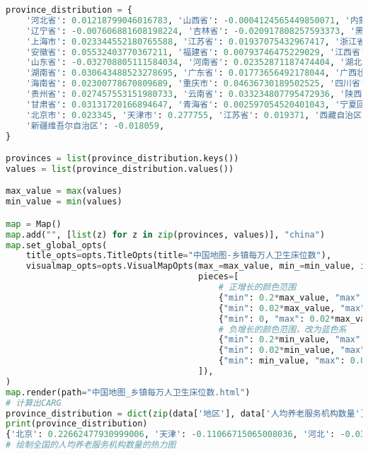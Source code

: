 \begin{lstlisting}[language=python,caption={基础设施}]
province_distribution = {
    '河北省': 0.01218799046016783, '山西省': -0.0004124565449850071, '内蒙古自治区': 0.008205003274858623, 
    '辽宁省': -0.007606881608198224, '吉林省': -0.020917808257593373, '黑龙江省': 0.007278157355442572, 
    '上海市': 0.023344552180765588, '江苏省': 0.01937075432967417, '浙江省': 0.050720686277746514, 
    '安徽省': 0.05532403770367211, '福建省': 0.00793746475229029, '江西省': 0.031851940133497125, 
    '山东省': -0.032708805111584034, '河南省': 0.02352871187474404, '湖北省': 0.04473898056377945, 
    '湖南省': 0.030643488523278695, '广东省': 0.01773656492178044, '广西壮族自治区': 0.06262170689609192, 
    '海南省': 0.02300778670809689, '重庆市': 0.04636730189502525, '四川省': 0.03806346202918354, 
    '贵州省': 0.027457553151980733, '云南省': 0.033234807795472936, '陕西省': 0.034586670171331324, 
    '甘肃省': 0.03131720166894647, '青海省': 0.002597054520401043, '宁夏回族自治区': 0.05882382172352507,
    '北京市': 0.023345, '天津市': 0.277755, '江苏省': 0.019371, '西藏自治区': 0.059866, 
    '新疆维吾尔自治区': -0.018059,   
}

provinces = list(province_distribution.keys())
values = list(province_distribution.values())

max_value = max(values)
min_value = min(values)

map = Map()
map.add("", [list(z) for z in zip(provinces, values)], "china")
map.set_global_opts(
    title_opts=opts.TitleOpts(title="中国地图-乡镇每万人卫生床位数"),
    visualmap_opts=opts.VisualMapOpts(max_=max_value, min_=min_value, is_piecewise=True,
                                      pieces=[
                                          # 正增长的颜色范围
                                          {"min": 0.2*max_value, "max": max_value, "label": "高正增长", "color": "#8B0000"},
                                          {"min": 0.02*max_value, "max": 0.2*max_value, "label": "中正增长", "color": "#FF6347"},
                                          {"min": 0, "max": 0.02*max_value, "label": "低正增长", "color": "#FFA07A"},
                                          # 负增长的颜色范围，改为蓝色系
                                          {"min": 0.2*min_value, "max": 0, "label": "低负增长", "color": "#ADD8E6"},
                                          {"min": 0.02*min_value, "max": 0.2*min_value, "label": "中负增长", "color": "#4169E1"},
                                          {"min": min_value, "max": 0.02*min_value, "label": "高负增长", "color": "#00008B"},
                                      ]),
)
map.render(path="中国地图_乡镇每万人卫生床位数.html")
# 计算出CARG
province_distribution = dict(zip(data['地区'], data['人均养老服务机构数量']))
print(province_distribution)
{'北京': 0.22662477930999006, '天津': -0.11066715065008036, '河北': -0.03297699943370547, '山西': -0.020665246305667902, '内蒙古': 0.006117405887125
# 绘制全国的人均养老服务机构数量的热力图


\end{lstlisting}

